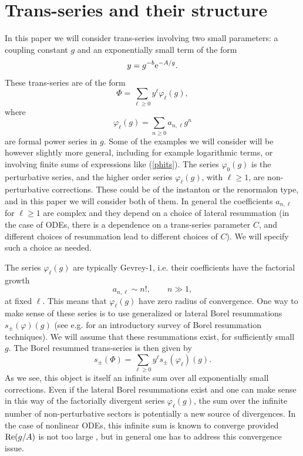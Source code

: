 \documentclass[a4paper,11pt]{article}
\theoremstyle{definition}
\newcommand{\re}{{\rm e}}
\newcommand{\be}{\begin{equation}}
\newcommand{\ee}{\end{equation}}
\begin{document}
 
 \section{Trans-series and their structure }
 \label{tss-sec}
In this paper we will consider trans-series involving two small parameters: a coupling 
constant $g$ and an exponentially small term of the form 
%
\be
y = g^{-b} \re^{-A/g}. 
\ee
%
These trans-series are of the form 
%
\be
\label{phits}
\Phi= \sum_{\ell \ge 0} y^{\ell}  \varphi_\ell (g), 
\ee
%
where 
%
\be
 \label{trans-not}
 \varphi_\ell (g)= \sum_{n \ge 0} a_{n, \ell} g^n
\ee
%
 are formal power series in $g$. Some of the examples we will consider 
 will be however slightly more general, including for example logarithmic terms, or involving 
 finite sums of expressions like (\ref{phits}). The series $\varphi_0(g)$ is the perturbative series, 
 and the higher order series $\varphi_\ell (g)$, with $\ell\ge 1$, 
 are non-perturbative corrections. These could be of the instanton or the renormalon type, 
and in this paper we will consider both of them. In general the coefficients $a_{n, \ell}$ for $\ell\ge 1$ are complex and they 
depend on a choice of lateral resummation (in the case of ODEs, there is a dependence on a trans-series parameter $C$, 
and different choices of resummation lead to different choices of $C$). We will specify such a choice as 
needed. 

The series $\varphi_\ell(g)$ are typically Gevrey-1, i.e. their coefficients have the factorial growth 
%
\be
a_{n, \ell} \sim n!, \qquad n \gg 1, 
\ee
%
at fixed $\ell$. This means that $\varphi_\ell(g)$ have zero radius of convergence. One way to make sense of these series is 
to use generalized or lateral Borel resummations  $s_\pm (\varphi)(g)$ (see e.g. \cite{mmbook} for an introductory 
survey of Borel resummation techniques). We will assume that these resummations exist, for sufficiently small $g$. 
The Borel resummed trans-series is then given by 
%
\be
\label{br-transseries}
s_\pm (\Phi)= \sum_{\ell \ge 0} y^{\ell} s_\pm (\varphi_\ell)(g). 
\ee
%
As we see, this object is itself an infinite sum over all exponentially small corrections. 
Even if the lateral Borel resummations exist and one can make sense in this way of the 
factorially divergent series $\varphi_\ell (g)$, the sum over the infinite number of 
non-perturbative sectors is potentially a new source of divergences. 
In the case of nonlinear ODEs, this infinite sum is known to converge provided 
${\rm Re}(g/A)$ is not too large \cite{costin}, but in general one has to address this convergence 
issue. 
\end{document}
